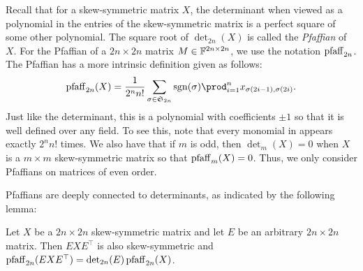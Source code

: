 \documentclass[letterpaper, 11pt]{amsart}
\begin{document}
Recall that for a skew-symmetric matrix $X$, the determinant when viewed as a polynomial in the entries of the skew-symmetric matrix is a perfect square of some other polynomial.
The square root of $\det_{2n}(X)$ is called the \emph{Pfaffian} of $X$.
For the Pfaffian of a $2n \times 2n$ matrix $M \in \mathbb{F}^{2n \times 2n}$, we use the notation $\operatorname{pfaff}_{2n}$.
The Pfaffian has a more intrinsic definition given as follows:
\begin{equation}\label{eq:pfaff_defn}
    \pfaff_{2n}(X) = \frac{1}{2^n n!} \sum_{\sigma \in \mathfrak{S}_{2n}} \sgn(\sigma) \prod_{i = 1}^n x_{\sigma(2i - 1), \sigma(2i)}.
\end{equation}
Just like the determinant, this is a polynomial with coefficients $\pm 1$ so that it is well defined over any field.
To see this, note that every monomial in  appears exactly $2^n n{!}$ times.
We also have that if $m$ is odd, then $\det_m(X) = 0$ when $X$ is a $m \times m$ skew-symmetric matrix so that $\operatorname{pfaff}_m(X) = 0$.
Thus, we only consider Pfaffians on matrices of even order.

Pfaffians are deeply connected to determinants, as indicated by the following lemma:
\begin{lem}[{\cite[Lemma 2.27]{AF22}}]\label{lem:pfaff_conj}
    Let $X$ be a $2n \times 2n$ skew-symmetric matrix and let $E$ be an arbitrary $2n \times 2n$ matrix.
    Then $EXE^\top$ is also skew-symmetric and $\operatorname{pfaff}_{2n}(EXE^\top) = \det_{2n}(E) \operatorname{pfaff}_{2n}(X)$.
\end{lem}
\end{document}

